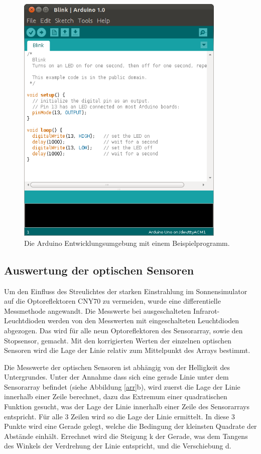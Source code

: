 \documentclass[a4paper,bibtotoc,oneside]{scrbook}
\begin{document}
\begin{figure}[htbp]
\centering
\includegraphics[width=100mm]{img/Arduino.png}
\caption{Die Arduino Entwicklungsumgebung mit einem Beispielprogramm.}\label{ardu2}
\end{figure}

\subsection{Auswertung der optischen Sensoren}\thispagestyle{empty}
Um den Einfluss des Streulichtes der starken Einstrahlung im Sonnensimulator auf die Optoreflektoren CNY70 zu vermeiden, wurde eine differentielle Messmethode angewandt. Die Messwerte bei ausgeschalteten Infrarot-Leuchtdioden werden von den Messwerten mit eingeschalteten Leuchtdioden abgezogen.
Das wird für alle neun Optoreflektoren des Sensorarray, sowie den Stopsensor, gemacht.
Mit den korrigierten Werten der einzelnen optischen Sensoren wird die Lage der Linie relativ zum Mittelpunkt des Arrays bestimmt. 

\noindent Die Messwerte der optischen Sensoren ist abhängig von der Helligkeit des Untergrundes. Unter der Annahme dass sich eine gerade Linie unter dem Sensorarray befindet (siehe Abbildung \ref{arr}b), wird zuerst die Lage der Linie innerhalb einer Zeile berechnet, dazu das Extremum einer quadratischen Funktion gesucht, was der Lage der Linie innerhalb einer Zeile des Sensorarrays entspricht. 
Für alle 3 Zeilen wird so die Lage der Linie ermittelt. In diese 3 Punkte wird eine Gerade gelegt, welche die Bedingung der kleinsten Quadrate der Abstände einhält. Errechnet wird die Steigung k der Gerade, was dem Tangens des Winkels der Verdrehung der Linie entspricht, und die Verschiebung d.
 
\end{document}
